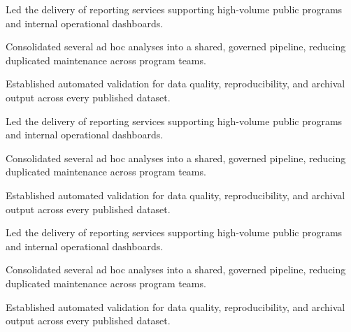 \documentclass[fontsize=11pt, margin=narrow, medium=print]{careerdossier-cv}
\begin{document}
\MakeCDossierHeader

\begin{CDossierEntry}[title = {Principal Data Scientist}, organization = {Digital Services Laboratory}, location = {Ottawa, ON}, dates = {2024--Present}]
  \begin{CDossierItemize}
    \item Led the delivery of reporting services supporting high-volume public programs and internal operational dashboards.
    \item Consolidated several ad hoc analyses into a shared, governed pipeline, reducing duplicated maintenance across program teams.
    \item Established automated validation for data quality, reproducibility, and archival output across every published dataset.
  \end{CDossierItemize}
\end{CDossierEntry}
\begin{CDossierEntry}[title = {Senior Data Scientist}, organization = {Civic Technology Research Group}, location = {Toronto, ON}, dates = {2021--2024}]
  \begin{CDossierItemize}
    \item Led the delivery of reporting services supporting high-volume public programs and internal operational dashboards.
    \item Consolidated several ad hoc analyses into a shared, governed pipeline, reducing duplicated maintenance across program teams.
    \item Established automated validation for data quality, reproducibility, and archival output across every published dataset.
  \end{CDossierItemize}
\end{CDossierEntry}
\begin{CDossierEntry}[title = {Data Scientist}, organization = {Public Data Analytics Incorporated}, location = {Waterloo, ON}, dates = {2018--2021}]
  \begin{CDossierItemize}
    \item Led the delivery of reporting services supporting high-volume public programs and internal operational dashboards.
    \item Consolidated several ad hoc analyses into a shared, governed pipeline, reducing duplicated maintenance across program teams.
    \item Established automated validation for data quality, reproducibility, and archival output across every published dataset.
  \end{CDossierItemize}
\end{CDossierEntry}
\end{document}
